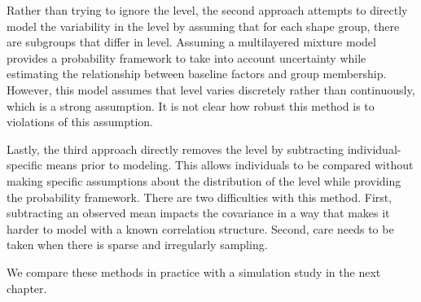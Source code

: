 Rather than trying to ignore the level, the second approach attempts to directly model the variability in the level by assuming that for each shape group, there are subgroups that differ in level. Assuming a multilayered mixture model provides a probability framework to take into account uncertainty while estimating the relationship between baseline factors and group membership. However, this model assumes that level varies discretely rather than continuously, which is a strong assumption. It is not clear how robust this method is to violations of this assumption.

Lastly, the third approach directly removes the level by subtracting individual-specific means prior to modeling. This allows individuals to be compared without making specific assumptions about the distribution of the level while providing the probability framework.  There are two difficulties with this method. First, subtracting an observed mean impacts the covariance in a way that makes it harder to model with a known correlation structure. Second, care needs to be taken when there is sparse and irregularly sampling. 

We compare these methods in practice with a simulation study in the next chapter.
